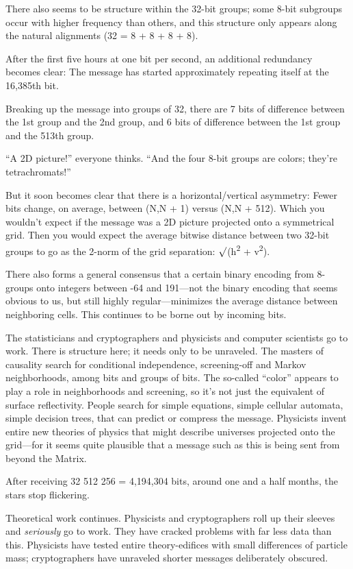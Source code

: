 {
 There also seems to be structure within the 32-bit groups; some
8-bit subgroups occur with higher frequency than others, and this
structure only appears along the natural alignments (32 = 8 + 8 + 8 +
8).}

{
 After the first five hours at one bit per second, an additional
redundancy becomes clear: The message has started approximately
repeating itself at the 16,385th bit.}

{
 Breaking up the message into groups of 32, there are 7 bits of
difference between the 1st group and the 2nd group, and 6 bits of
difference between the 1st group and the 513th group.}

{
 ``A 2D picture!'' everyone
thinks. ``And the four 8-bit groups are colors;
they're tetrachromats!''}

{
 But it soon becomes clear that there is a horizontal/vertical
asymmetry: Fewer bits change, on average, between (N,N + 1) versus (N,N
+ 512). Which you wouldn't expect if the message was a
2D picture projected onto a symmetrical grid. Then you would expect the
average bitwise distance between two 32-bit groups to go as the 2-norm
of the grid separation: ${\surd}$(h\textsuperscript{2} +
v\textsuperscript{2}).}

{
 There also forms a general consensus that a certain binary
encoding from 8-groups onto integers between -64 and 191---not the
binary encoding that seems obvious to us, but still highly
regular---minimizes the average distance between neighboring cells.
This continues to be borne out by incoming bits.}

{
 The statisticians and cryptographers and physicists and computer
scientists go to work. There is structure here; it needs only to be
unraveled. The masters of causality search for conditional
independence, screening-off and Markov neighborhoods, among bits and
groups of bits. The so-called
``color'' appears to play a role in
neighborhoods and screening, so it's not just the
equivalent of surface reflectivity. People search for simple equations,
simple cellular automata, simple decision trees, that can predict or
compress the message. Physicists invent entire new theories of physics
that might describe universes projected onto the grid---for it seems
quite plausible that a message such as this is being sent from beyond
the Matrix.}

{
 After receiving 32 {\texttimes} 512 {\texttimes} 256 = 4,194,304
bits, around one and a half months, the stars stop flickering.}

{
 Theoretical work continues. Physicists and cryptographers roll up
their sleeves and \textit{seriously} go to work. They have cracked
problems with far less data than this. Physicists have tested entire
theory-edifices with small differences of particle mass; cryptographers
have unraveled shorter messages deliberately obscured.}

